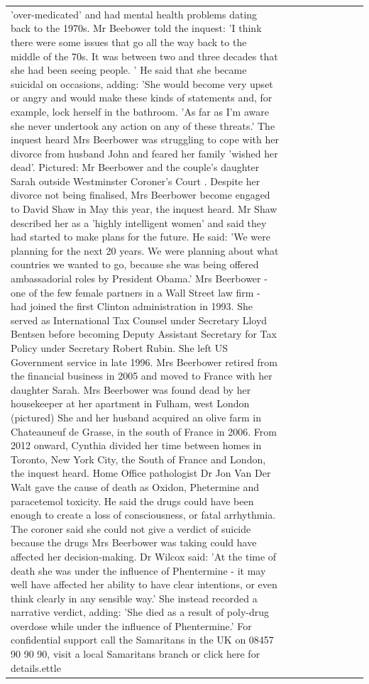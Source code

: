 \begin{table}[H]
\begin{tabular}{lllrlllll}
'over-medicated' and had mental health problems dating back to the 1970s. Mr Beebower told the inquest: 'I think there were some issues that go all the way back to the middle of the 70s. It was between two and three decades that she had been seeing people. ' He said that she became suicidal on occasions, adding: 'She would become very upset or angry and would make these kinds of statements and, for example, lock herself in the bathroom. 'As far as I'm aware she never undertook any action on any of these threats.' The inquest heard Mrs Beerbower was struggling to cope with her divorce from husband John and feared her family 'wished her dead'. Pictured: Mr Beerbower and the couple's daughter Sarah outside Westminster Coroner's Court . Despite her divorce not being finalised, Mrs Beerbower become engaged to David Shaw in May this year, the inquest heard. Mr Shaw described her as a 'highly intelligent women' and said they had started to make plans for the future. He said: 'We were planning for the next 20 years. We were planning about what countries we wanted to go, because she was being offered ambassadorial roles by President Obama.' Mrs Beerbower - one of the few female partners in a Wall Street law firm - had joined the first Clinton administration in 1993. She served as International Tax Counsel under Secretary Lloyd Bentsen before becoming Deputy Assistant Secretary for Tax Policy under Secretary Robert Rubin. She left US Government service in late 1996. Mrs Beerbower retired from the financial business in 2005 and moved to France with her daughter Sarah. Mrs Beerbower was found dead by her housekeeper at her apartment in Fulham, west London (pictured) She and her husband acquired an olive farm in Chateauneuf de Grasse, in the south of France in 2006. From 2012 onward, Cynthia divided her time between homes in Toronto, New York City, the South of France and London, the inquest heard. Home Office pathologist Dr Jon Van Der Walt gave the cause of death as Oxidon, Phetermine and paracetemol toxicity. He said the drugs could have been enough to create a loss of consciousness, or fatal arrhythmia. The coroner said she could not give a verdict of suicide because the drugs Mrs Beerbower was taking could have affected her decision-making. Dr Wilcox said: 'At the time of death she was under the influence of Phentermine - it may well have affected her ability to have clear intentions, or even think clearly in any sensible way.' She instead recorded a narrative verdict, adding: 'She died as a result of poly-drug overdose while under the influence of Phentermine.' For confidential support call the Samaritans in the UK on 08457 90 90 90, visit a local Samaritans branch or click here for details.ettle \\

\end{tabular}
\end{table}
